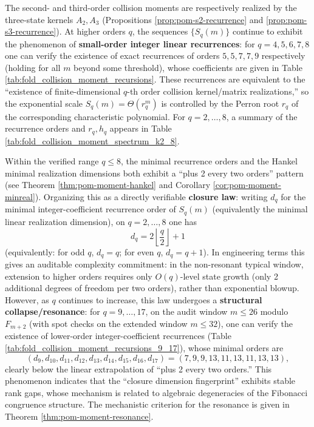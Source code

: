 \begin{remark}\label{rem:pom-moment-rec}
The second- and third-order collision moments are respectively realized by the three-state kernels \(A_2,A_3\) (Propositions \ref{prop:pom-s2-recurrence} and \ref{prop:pom-s3-recurrence}). At higher orders \(q\), the sequences \(\{S_q(m)\}\) continue to exhibit the phenomenon of \textbf{small-order integer linear recurrences}: for \(q=4,5,6,7,8\) one can verify the existence of exact recurrences of orders \(5,5,7,7,9\) respectively (holding for all \(m\) beyond some threshold), whose coefficients are given in Table \ref{tab:fold_collision_moment_recursions}. These recurrences are equivalent to the ``existence of finite-dimensional \(q\)-th order collision kernel/matrix realizations,'' so the exponential scale \(S_q(m)=\Theta(r_q^m)\) is controlled by the Perron root \(r_q\) of the corresponding characteristic polynomial.
For \(q=2,\dots,8\), a summary of the recurrence orders and \(r_q,h_q\) appears in Table \ref{tab:fold_collision_moment_spectrum_k2_8}.


Within the verified range \(q\le 8\), the minimal recurrence orders and the Hankel minimal realization dimensions both exhibit a ``plus 2 every two orders'' pattern (see Theorem \ref{thm:pom-moment-hankel} and Corollary \ref{cor:pom-moment-minreal}).
Organizing this as a directly verifiable \textbf{closure law}: writing \(d_q\) for the minimal integer-coefficient recurrence order of \(S_q(m)\) (equivalently the minimal linear realization dimension), on \(q=2,\dots,8\) one has
\[
\boxed{\;
d_q = 2\left\lfloor \frac{q}{2}\right\rfloor+1\;}
\]
(equivalently: for odd \(q\), \(d_q=q\); for even \(q\), \(d_q=q+1\)).
In engineering terms this gives an auditable complexity commitment: in the non-resonant typical window, extension to higher orders requires only \(O(q)\)-level state growth (only 2 additional degrees of freedom per two orders), rather than exponential blowup.
However, as \(q\) continues to increase, this law undergoes a \textbf{structural collapse/resonance}: for \(q=9,\dots,17\), on the audit window \(m\le 26\) modulo \(F_{m+2}\) (with spot checks on the extended window \(m\le 32\)), one can verify the existence of lower-order integer-coefficient recurrences (Table \ref{tab:fold_collision_moment_recursions_9_17}), whose minimal orders are
\[
(d_9,d_{10},d_{11},d_{12},d_{13},d_{14},d_{15},d_{16},d_{17})=(7,9,9,13,11,13,11,13,13),
\]
clearly below the linear extrapolation of ``plus 2 every two orders.'' This phenomenon indicates that the ``closure dimension fingerprint'' exhibits stable rank gaps, whose mechanism is related to algebraic degeneracies of the Fibonacci congruence structure. The mechanistic criterion for the resonance is given in Theorem \ref{thm:pom-moment-resonance}.
\end{remark}

